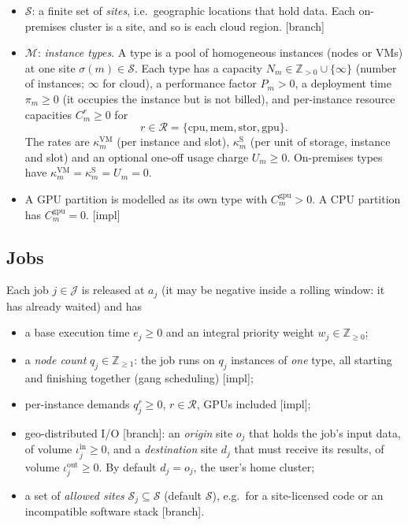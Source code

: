 \documentclass[11pt,a4paper]{article}
\newcommand{\J}{\mathcal{J}}
\newcommand{\M}{\mathcal{M}}
\newcommand{\Sites}{\mathcal{S}}
\newcommand{\Res}{\mathcal{R}}
\newcommand{\Z}{\mathbb{Z}}
\newcommand{\pin}{\mathrm{in}}
\newcommand{\pout}{\mathrm{out}}
\newcommand{\status}[1]{\textsf{\small[#1]}}
\begin{document}
\begin{itemize}[leftmargin=*]
\item $\Sites$: a finite set of \emph{sites}, i.e.\ geographic locations that
  hold data. Each on-premises cluster is a site, and so is each cloud region.
  \status{branch}
\item $\M$: \emph{instance types}. A type is a pool of homogeneous instances
  (nodes or VMs) at one site $\sigma(m)\in\Sites$. Each type has a capacity
  $N_m\in\Z_{>0}\cup\{\infty\}$ (number of instances; $\infty$ for cloud), a
  performance factor $P_m>0$, a deployment time $\pi_m\ge0$ (it occupies the
  instance but is not billed), and per-instance resource capacities
  $C^r_m\ge0$ for
  \[
    r\in\Res=\{\mathrm{cpu},\mathrm{mem},\mathrm{stor},\mathrm{gpu}\}.
  \]
  The rates are $\kappa^{\mathrm{VM}}_m$ (per instance and slot),
  $\kappa^{\mathrm{S}}_m$ (per unit of storage, instance and slot) and an
  optional one-off usage charge $U_m\ge0$. On-premises types have
  $\kappa^{\mathrm{VM}}_m=\kappa^{\mathrm{S}}_m=U_m=0$.
\item A GPU partition is modelled as its own type with $C^{\mathrm{gpu}}_m>0$.
  A CPU partition has $C^{\mathrm{gpu}}_m=0$. \status{impl}
\end{itemize}

\subsection{Jobs}

Each job $j\in\J$ is released at $a_j$ (it may be negative inside a rolling
window: it has already waited) and has
\begin{itemize}[leftmargin=*]
\item a base execution time $e_j\ge0$ and an integral priority weight
  $w_j\in\Z_{\ge0}$;
\item a \emph{node count} $q_j\in\Z_{\ge1}$: the job runs on $q_j$ instances of
  \emph{one} type, all starting and finishing together (gang scheduling)
  \status{impl};
\item per-instance demands $q^r_j\ge0$, $r\in\Res$, GPUs included
  \status{impl};
\item geo-distributed I/O \status{branch}: an \emph{origin} site $o_j$ that
  holds the job's input data, of volume $\iota^\pin_j\ge0$, and a
  \emph{destination} site $d_j$ that must receive its results, of volume
  $\iota^\pout_j\ge0$. By default $d_j=o_j$, the user's home cluster;
\item a set of \emph{allowed sites} $\Sites_j\subseteq\Sites$ (default
  $\Sites$), e.g.\ for a site-licensed code or an incompatible software stack
  \status{branch}.
\end{itemize}
\end{document}
